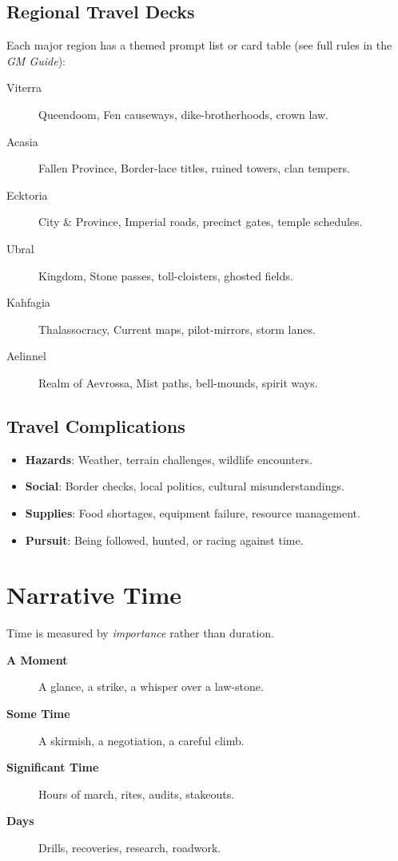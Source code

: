 \subsection*{Regional Travel Decks}
\label{sec:travel-decks}
Each major region has a themed prompt list or card table (see full rules in the \textit{GM Guide}):
\begin{description}
\item[Viterra]  Queendoom, Fen causeways, dike-brotherhoods, crown law.
\item[Acasia]  Fallen Province, Border-lace titles, ruined towers, clan tempers.
\item[Ecktoria]  City & Province, Imperial roads, precinct gates, temple schedules.
\item[Ubral]  Kingdom, Stone passes, toll-cloisters, ghosted fields.
\item[Kahfagia]  Thalassocracy, Current maps, pilot-mirrors, storm lanes.
\item[Aelinnel]  Realm of Aevrossa, Mist paths, bell-mounds, spirit ways.
\end{description}

\subsection*{Travel Complications}
\label{sec:travel-complications}
\begin{itemize}
\item \textbf{Hazards}: Weather, terrain challenges, wildlife encounters.
\item \textbf{Social}: Border checks, local politics, cultural misunderstandings.
\item \textbf{Supplies}: Food shortages, equipment failure, resource management.
\item \textbf{Pursuit}: Being followed, hunted, or racing against time.
\end{itemize}

\section{Narrative Time}
\label{sec:narrative-time}
Time is measured by \emph{importance} rather than duration.
\begin{description}
\item[\textbf{A Moment}]  A glance, a strike, a whisper over a law-stone.
\item[\textbf{Some Time}]  A skirmish, a negotiation, a careful climb.
\item[\textbf{Significant Time}]  Hours of march, rites, audits, stakeouts.
\item[\textbf{Days}]  Drills, recoveries, research, roadwork.
\end{description}

